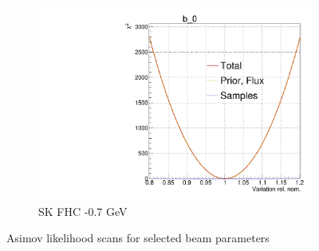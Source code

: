 \begin{figure}[h]
\begin{subfigure}[t]{0.32\textwidth}
		\includegraphics[width=\textwidth, trim={0mm 0mm 0mm 11mm}, clip,page=55]{figures/mach3/2018/llh/tryBinningNumber6_after_fit_asimov_asimov_ND280logL_scan}
		\caption{SK FHC -0.7 GeV}
	\end{subfigure}
	\caption{Asimov likelihood scans for selected beam parameters}
	\label{fig:beam_asimov_llh_2018}
\end{figure}

